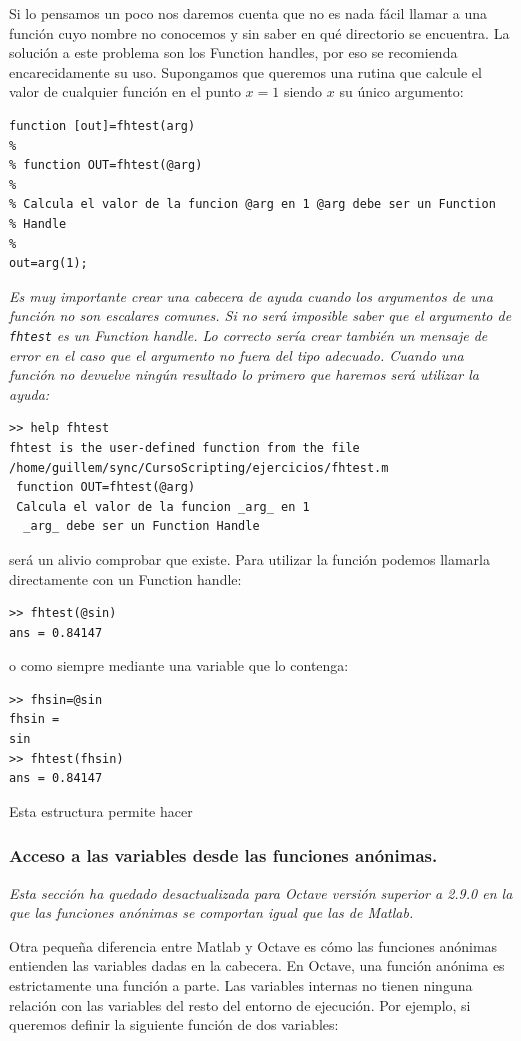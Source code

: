Si lo pensamos un poco nos daremos cuenta que no es nada fácil llamar
a una función cuyo nombre no conocemos y sin saber en qué directorio
se encuentra. La solución a este problema son los Function handles,
por eso se recomienda encarecidamente su uso. Supongamos que queremos
una rutina que calcule el valor de cualquier función en el punto $x=1$
siendo $x$ su único argumento:

\begin{verbatim}
function [out]=fhtest(arg)
%
% function OUT=fhtest(@arg)
%
% Calcula el valor de la funcion @arg en 1 @arg debe ser un Function
% Handle
%
out=arg(1);
\end{verbatim}
\emph{Es muy importante crear una cabecera de ayuda cuando los
  argumentos de una función no son escalares comunes. Si no será
  imposible saber que el argumento de} \texttt{\emph{fhtest}} \emph{es
  un Function handle.  Lo correcto sería crear también un mensaje de
  error en el caso que el argumento no fuera del tipo adecuado. Cuando
  una función no devuelve ningún resultado lo primero que haremos será
  utilizar la ayuda:}

\begin{verbatim}
>> help fhtest
fhtest is the user-defined function from the file
/home/guillem/sync/CursoScripting/ejercicios/fhtest.m
 function OUT=fhtest(@arg)
 Calcula el valor de la funcion _arg_ en 1
  _arg_ debe ser un Function Handle
\end{verbatim}
será un alivio comprobar que existe.  Para utilizar la función podemos
llamarla directamente con un Function handle:

\begin{verbatim}
>> fhtest(@sin)
ans = 0.84147
\end{verbatim}
o como siempre mediante una variable que lo contenga:

\begin{verbatim}
>> fhsin=@sin
fhsin =
sin
>> fhtest(fhsin)
ans = 0.84147
\end{verbatim}
Esta estructura permite hacer


\subsubsection{Acceso a las variables desde las funciones anónimas.}

\emph{Esta sección ha quedado desactualizada para Octave versión
  superior a 2.9.0 en la que las funciones anónimas se comportan igual
  que las de Matlab.}

Otra pequeña diferencia entre Matlab y Octave es cómo las funciones
anónimas entienden las variables dadas en la cabecera. En Octave, una
función anónima es estrictamente una función a parte. Las variables
internas no tienen ninguna relación con las variables del resto del
entorno de ejecución. Por ejemplo, si queremos definir la siguiente
función de dos variables:

